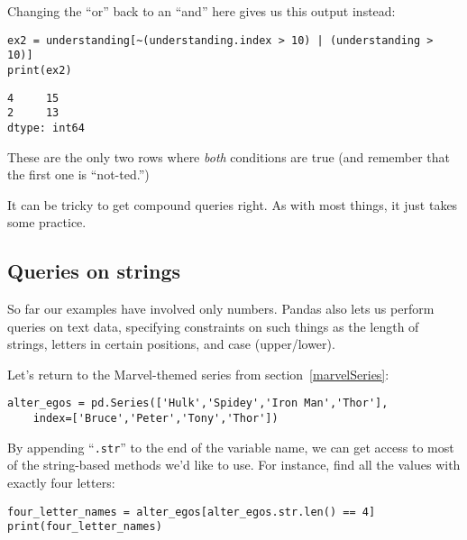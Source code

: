 Changing the ``or'' back to an ``and'' here gives us this output instead:

\begin{Verbatim}[fontsize=\small,samepage=true,frame=single,framesep=3mm]
ex2 = understanding[~(understanding.index > 10) | (understanding > 10)]
print(ex2)
\end{Verbatim}

\begin{Verbatim}[fontsize=\small,samepage=true,frame=leftline,framesep=5mm,framerule=1mm]
4     15
2     13
dtype: int64
\end{Verbatim}

These are the only two rows where \textit{both} conditions are true (and
remember that the first one is ``not-ted.'')

It can be tricky to get compound queries right. As with most things, it just
takes some practice.

\subsection{Queries on strings}

So far our examples have involved only numbers. Pandas also lets us perform
queries on text data, specifying constraints on such things as the length of
strings, letters in certain positions, and case (upper/lower).


Let's return to the Marvel-themed series from section~\ref{marvelSeries}:

\begin{Verbatim}[fontsize=\small,samepage=true,frame=single,framesep=3mm]
alter_egos = pd.Series(['Hulk','Spidey','Iron Man','Thor'],
    index=['Bruce','Peter','Tony','Thor'])
\end{Verbatim}


By appending ``\texttt{.str}'' to the end of the variable name, we can get
access to most of the string-based methods we'd like to use. For instance, find
all the values with exactly four letters:

\begin{Verbatim}[fontsize=\small,samepage=true,frame=single,framesep=3mm]
four_letter_names = alter_egos[alter_egos.str.len() == 4]
print(four_letter_names)
\end{Verbatim}
\vspace{-.3in}

